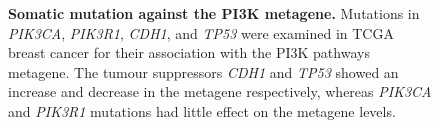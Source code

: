 \begin{figure}[!ht]
\begin{center}
    \end{center}
    \caption[Somatic \gls{mutation} against the PI3K \gls{metagene}]{\small \textbf{Somatic \gls{mutation} against the PI3K \gls{metagene}.} Mutations in \textit{PIK3CA}, \textit{PIK3R1}, \textit{CDH1}, and \textit{TP53} were examined in \gls{TCGA} breast cancer for their association with the PI3K \citep{Gatza2011} \glspl{pathway} \gls{metagene}. The \glspl{tumour suppressor} \textit{CDH1} and \textit{TP53} showed an increase and decrease in the \gls{metagene} respectively, whereas \textit{PIK3CA} and \textit{PIK3R1} \glspl{mutation} had little effect on the \gls{metagene} levels.
}
\label{fig:mutation_expr_mg}
\end{figure}

